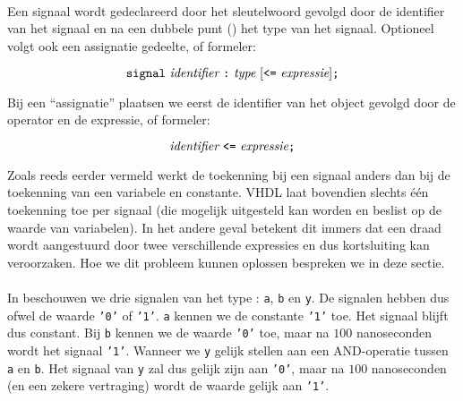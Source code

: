 \paragraph{}
Een signaal wordt gedeclareerd door het sleutelwoord  gevolgd door de identifier van het signaal en na een dubbele punt (\vhdltermen{:}) het type van het signaal. Optioneel volgt ook een assignatie gedeelte, of formeler:

\begin{equation}%
\vhdltermen{signal}\ \textit{identifier}\ \vhdltermen{:}\ \textit{type}\ [\vhdltermen{<=}\ \textit{expressie}]\vhdltermen{;}
\end{equation}

Bij een ``assignatie'' plaatsen we eerst de identifier van het object gevolgd door de \vhdltermen{<=} operator en de expressie, of formeler:

\begin{equation}%
\textit{identifier}\ \vhdltermen{<=}\ \textit{expressie}\vhdltermen{;}
\end{equation}

Zoals reeds eerder vermeld werkt de toekenning bij een signaal anders dan bij de toekenning van een variabele en constante.
VHDL laat bovendien slechts \'e\'en toekenning toe per signaal (die mogelijk uitgesteld kan worden en beslist op de waarde
van variabelen). In het andere geval betekent dit immers dat een draad wordt aangestuurd door twee verschillende expressies
en dus kortsluiting kan veroorzaken. Hoe we dit probleem kunnen oplossen bespreken we in deze sectie.

\paragraph{}

In  beschouwen we drie signalen van het type : \texttt{a}, \texttt{b} en \texttt{y}. De signalen hebben dus ofwel de waarde \texttt{'0'} of \texttt{'1'}. \texttt{a} kennen we de constante \texttt{'1'} toe. Het signaal blijft dus constant. Bij \texttt{b} kennen we de waarde \texttt{'0'} toe, maar na $100$ nanoseconden wordt het signaal \texttt{'1'}. Wanneer we \texttt{y} gelijk stellen aan een AND-operatie tussen \texttt{a} en \texttt{b}. Het signaal van \texttt{y} zal dus gelijk zijn aan \texttt{'0'}, maar na $100$ nanoseconden (en een zekere vertraging) wordt de waarde gelijk aan \texttt{'1'}.

